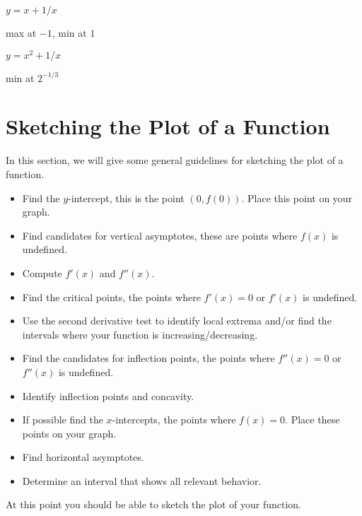 \begin{exercises}
\begin{exercise} $y = x+ 1/x$
\begin{answer} max at $-1$, min at $1$
\end{answer}\end{exercise}

\begin{exercise} $y = x^2+ 1/x$
\begin{answer} min at $2^{-1/3}$
\end{answer}\end{exercise}


\endtwocol
\end{exercises}












\section{Sketching the Plot of a Function} 


In this section, we will give some general guidelines for sketching
the plot of a function.

\begin{procedureForPlotting}\hfil
\begin{itemize}
\item Find the $y$-intercept, this is the point $(0,f(0))$. Place this
  point on your graph.
\item Find candidates for vertical asymptotes, these are points where
  $f(x)$ is undefined.
\item Compute $f'(x)$ and $f''(x)$.
\item Find the critical points, the points where $f'(x) = 0$ or
  $f'(x)$ is undefined.
\item Use the second derivative test to identify local extrema and/or
  find the intervals where your function is increasing/decreasing.
\item Find the candidates for inflection points, the points where
  $f''(x) = 0$ or $f''(x)$ is undefined.
\item Identify inflection points and concavity.
\item If possible find the $x$-intercepts, the points where $f(x) =
  0$. Place these points on your graph.
\item Find horizontal asymptotes.
\item Determine an interval that shows all relevant behavior.
\end{itemize}
At this point you should be able to sketch the plot of your function.
\end{procedureForPlotting}

